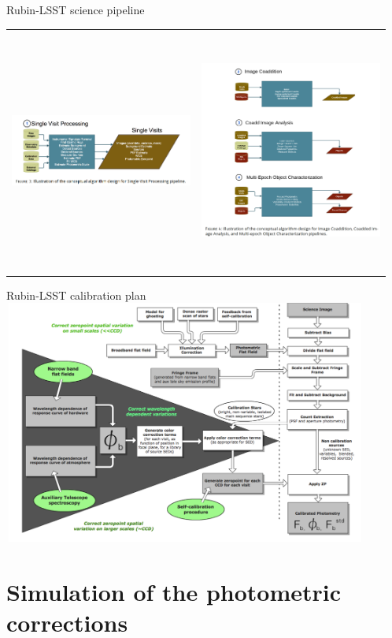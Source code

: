 \documentclass{beamer}
\begin{document}
\begin{frame}{Rubin-LSST science pipeline}
\begin{tabular}{cc}
\includegraphics[width=6cm, height=3.5cm]{figs/dm/DMpipelines11.png}
&
\includegraphics[width=6cm, height=8cm]{figs/dm/DMpipelines2.png}
\end{tabular}
\end{frame}

\begin{frame}{Rubin-LSST calibration plan}
\includegraphics[width=12cm, height=8cm]{figs/calib/LSSTCalibrationPlan.png}
\end{frame}


\section{Simulation of the photometric corrections}
\end{document}

